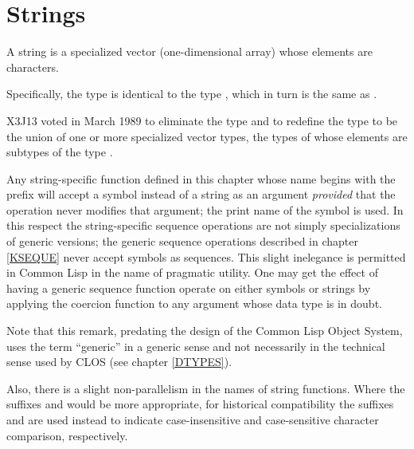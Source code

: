 
\ifx \rulang\Undef

\chapter{Strings}
\def\pagestatus{FINAL PROOF}

A string is a specialized vector (one-dimensional array)
whose elements are characters.

\begin{obsolete}
Specifically, the type 
is identical to the type , which in turn
is the same as .
\end{obsolete}

\begin{newer}
X3J13 voted in March 1989 
to eliminate the type  and to redefine the type
 to be the union of one or more specialized vector
types, the types of whose elements are subtypes of the type .
\end{newer}

Any string-specific function defined in this chapter
whose name begins with the prefix 
will accept a symbol instead of a string
as an argument \emph{provided} that the operation never modifies that argument;
the print name of the symbol is used.
In this respect the string-specific sequence operations are not
simply specializations of generic versions; the generic sequence
operations described in chapter \ref{KSEQUE} never accept symbols as sequences.
This slight inelegance is permitted in Common Lisp in the name of pragmatic utility.
One may get the effect of having a generic sequence function
operate on either symbols or strings by applying the coercion
function  to any argument whose data type is in doubt.

\begin{new}
Note that this remark, predating the design of the Common Lisp Object System,
uses the term ``generic'' in a generic sense and not necessarily
in the technical sense used by CLOS
(see chapter \ref{DTYPES}).
\end{new}

Also, there is a slight non-parallelism in the names of string functions.
Where the suffixes  and  would be more appropriate,
for historical compatibility the suffixes  and \cdf{=} are used instead
to indicate case-insensitive and case-sensitive character comparison,
respectively.

